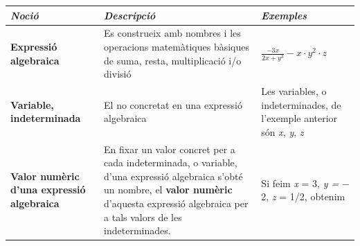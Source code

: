  
 \newpage
\vspace*{-0.5cm}
\resum
\begin{center}
	\renewcommand*{\arraystretch}{1.2}	
	\begin{longtable}{|P{0.2\textwidth}|p{0.35\textwidth}|p{0.35\textwidth}|} \hline 
		 \textit{Noció} & \textit{Descripció} & \textit{Exemples} \\ \hline 
		 \textbf{Expressió algebraica} & Es construeix amb nombres i les operacions matemàtiques bàsiques de suma, resta, multiplicació i/o divisió & \newline $\frac{-3x}{2x+y^{3} } -x\cdot y^{2} \cdot z$ \\ \hline 
		 \textbf{Variable, indeterminada} & El no concretat en una expressió algebraica & Les variables, o indeterminades, de l'exemple anterior són \textit{x}, \textit{y}, \textit{z} \\ \hline 
		 \textbf{Valor numèric d'una expressió algebraica} & En fixar un valor concret per a cada indeterminada, o variable, d'una expressió algebraica s'obté un nombre, el \textbf{valor numèric} d'aquesta expressió algebraica per a tals valors de les indeterminades. & Si feim \textit{x }= 3, \textit{y =} $-$2, \textit{z }= 1/2, obtenim 
		

\end{longtable}
\end{center}
